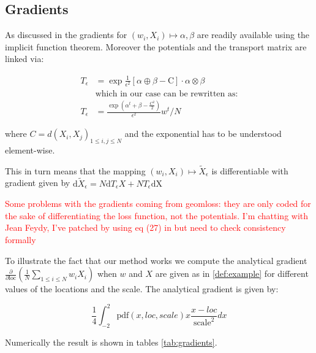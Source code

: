 \documentclass[%
reprint,
amsmath,amssymb,
aps,
]{revtex4-2}
\newcommand\todo[1]{\textcolor{red}{#1}}
\begin{document}
		\subsection{Gradients}
			As discussed in \cite{feydy:hal-01827184} the gradients for $(w_i, X_i) \mapsto \alpha, \beta$ are readily available using the implicit function theorem. 
			Moreover the potentials and the transport matrix are linked via:

			\begin{align*}
				T_{\epsilon} &= \exp \tfrac{1}{\epsilon^2}[\alpha\oplus \beta - \text{C}] \cdot \alpha\otimes \beta \\
				~& \text{which in our case can be rewritten as:}\\
				T_{\epsilon} &= \frac{\exp{(\alpha^t + \beta -\frac{C^2}{2})}}{\epsilon^2} w^t / N
			\end{align*}

			where $C = d(X_i, X_j)_{1 \leq i, j\leq N}$ and the exponential has to be understood element-wise.
			
			This in turn means that the mapping $(w_i, X_i) \mapsto \tilde{X}_{\epsilon}$ is differentiable with gradient given by $\text{d}\tilde{X}_\epsilon = N \text{d}T_\epsilon X + N T_\epsilon \text{dX}$
		
			
			\todo{Some problems with the gradients coming from geomloss: they are only coded for the sake of differentiating the loss function, not the potentials. I'm chatting with Jean Feydy, I've patched by using eq (27) in \cite{feydy:interpolating} but need to check consistency formally}
				
			To illustrate the fact that our method works we compute the analytical gradient $ \frac{\partial }{\partial \text{loc}} \left( \tfrac{1}{N} \sum_{1 \leq i\leq N } w_i X_i \right)$ when $w$ and $X$ are given as in \cref{def:example} for different values of the locations and the scale. The analytical gradient is given by:
			
			$$ 
			\frac{1}{4} \int_{-2}^{2}\text{pdf}(x, loc, scale) x \frac{x-loc}{\text{scale}^2} dx
			$$
			
			Numerically the result is shown in tables \cref{tab:gradients}.
			
\end{document}
